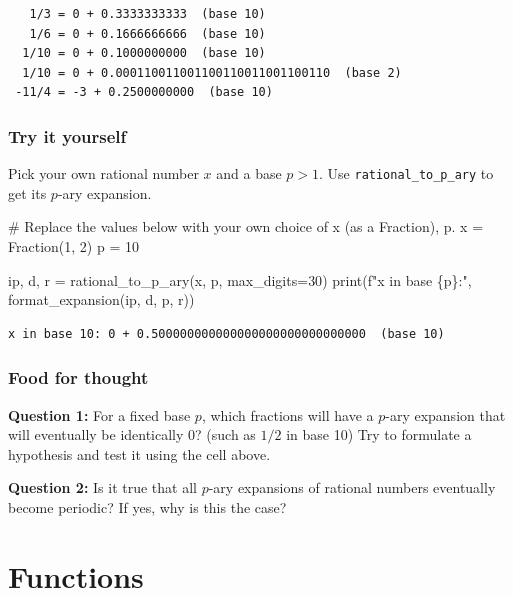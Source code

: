 \documentclass[
  letterpaper,
  DIV=11,
  numbers=noendperiod]{scrreprt}
\newenvironment{Shaded}{\begin{snugshade}}{\end{snugshade}}
\newcommand{\BuiltInTok}[1]{\textcolor[rgb]{0.00,0.23,0.31}{#1}}
\newcommand{\CommentTok}[1]{\textcolor[rgb]{0.37,0.37,0.37}{#1}}
\newcommand{\DecValTok}[1]{\textcolor[rgb]{0.68,0.00,0.00}{#1}}
\newcommand{\NormalTok}[1]{\textcolor[rgb]{0.00,0.23,0.31}{#1}}
\newcommand{\OperatorTok}[1]{\textcolor[rgb]{0.37,0.37,0.37}{#1}}
\newcommand{\SpecialCharTok}[1]{\textcolor[rgb]{0.37,0.37,0.37}{#1}}
\newcommand{\SpecialStringTok}[1]{\textcolor[rgb]{0.13,0.47,0.30}{#1}}
\theoremstyle{plain}
\theoremstyle{plain}
\theoremstyle{definition}
\theoremstyle{definition}
\theoremstyle{definition}
\theoremstyle{plain}
\theoremstyle{plain}
\theoremstyle{remark}
\begin{document}
\begin{verbatim}
   1/3 = 0 + 0.3333333333  (base 10)
   1/6 = 0 + 0.1666666666  (base 10)
  1/10 = 0 + 0.1000000000  (base 10)
  1/10 = 0 + 0.000110011001100110011001100110  (base 2)
 -11/4 = -3 + 0.2500000000  (base 10)
\end{verbatim}

\section{Try it yourself}\label{try-it-yourself}

Pick your own rational number \(x\) and a base \(p > 1\). Use
\texttt{rational\_to\_p\_ary} to get its \(p\)-ary expansion.

\begin{Shaded}
\begin{Highlighting}[]
\CommentTok{\# Replace the values below with your own choice of x (as a Fraction), p.}
\NormalTok{x }\OperatorTok{=}\NormalTok{ Fraction(}\DecValTok{1}\NormalTok{, }\DecValTok{2}\NormalTok{)}
\NormalTok{p }\OperatorTok{=} \DecValTok{10}


\NormalTok{ip, d, r }\OperatorTok{=}\NormalTok{ rational\_to\_p\_ary(x, p, max\_digits}\OperatorTok{=}\DecValTok{30}\NormalTok{)}
\BuiltInTok{print}\NormalTok{(}\SpecialStringTok{f"x in base }\SpecialCharTok{\{}\NormalTok{p}\SpecialCharTok{\}}\SpecialStringTok{:"}\NormalTok{, format\_expansion(ip, d, p, r))}
\end{Highlighting}
\end{Shaded}

\begin{verbatim}
x in base 10: 0 + 0.500000000000000000000000000000  (base 10)
\end{verbatim}

\section{Food for thought}\label{food-for-thought}

\textbf{Question 1:} For a fixed base \(p\), which fractions will have a
\(p\)-ary expansion that will eventually be identically \(0\)? (such as
\(1/2\) in base 10) Try to formulate a hypothesis and test it using the
cell above.

\textbf{Question 2:} Is it true that all \(p\)-ary expansions of
rational numbers eventually become periodic? If yes, why is this the
case?

\part{Functions}
\end{document}
